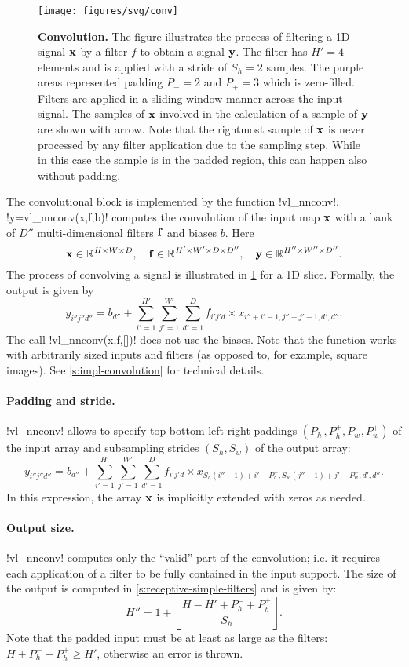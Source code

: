 \begin{figure}[t]
	\centering
	\texttt{[image: figures/svg/conv]}
	\caption{\textbf{Convolution.} The figure illustrates the process of filtering a 1D signal $\mathbf{x}$ by a filter $f$ to obtain a signal $\mathbf{y}$. The filter has $H'=4$ elements and is applied with a stride of $S_h =2$ samples. The purple areas represented padding $P_-=2$ and $P_+=3$ which is zero-filled. Filters are applied in a sliding-window manner across the input signal. The samples of $\mathbf{x}$ involved in the calculation of a sample of $\mathbf{y}$ are shown with arrow. Note that the rightmost sample of $\mathbf{x}$  is never processed by any filter application due to the sampling step. While in this case the sample is in the padded region, this can happen also without padding.}\label{f:conv}
\end{figure}

The convolutional block is implemented by the function !vl_nnconv!. !y=vl_nnconv(x,f,b)! computes the convolution of the input map $\mathbf{x}$ with a bank of $D''$ multi-dimensional filters $\mathbf{f}$ and biases $b$. Here
\[
 \mathbf{x}\in\mathbb{R}^{H \times W \times D}, \quad
 \mathbf{f}\in\mathbb{R}^{H' \times W' \times D \times D''}, \quad
 \mathbf{y}\in\mathbb{R}^{H'' \times W'' \times D''}.
\]
The process of convolving a signal is illustrated in \cref{f:conv} for a 1D slice. Formally, the output is given by
\[
y_{i''j''d''}
=
b_{d''}
+
\sum_{i'=1}^{H'}
\sum_{j'=1}^{W'}
\sum_{d'=1}^D
f_{i'j'd} \times x_{i''+i'-1,j''+j'-1,d',d''}.
\]
The call !vl_nnconv(x,f,[])! does not use the biases. Note that the function works with arbitrarily sized inputs and filters (as opposed to, for example, square images). See \cref{s:impl-convolution} for technical details.

\paragraph{Padding and stride.} !vl_nnconv! allows to specify  top-bottom-left-right paddings $(P_h^-,P_h^+,P_w^-,P_w^+)$ of the input array and subsampling strides $(S_h,S_w)$ of the output array:
\[
y_{i''j''d''}
=
b_{d''}
+
\sum_{i'=1}^{H'}
\sum_{j'=1}^{W'}
\sum_{d'=1}^D
f_{i'j'd} \times x_{S_h (i''-1)+i'-P_h^-, S_w(j''-1)+j' - P_w^-,d',d''}.
\]
In this expression, the array $\mathbf{x}$ is implicitly extended with zeros as needed.

\paragraph{Output size.} !vl_nnconv! computes only the ``valid'' part of the convolution; i.e. it requires each application of a filter to be fully contained in the input support.  The size of the output is computed in \cref{s:receptive-simple-filters} and is given by:
\[
  H'' = 1 + \left\lfloor \frac{H - H' + P_h^- + P_h^+}{S_h} \right\rfloor.
\]
Note that the padded input must be at least as large as the filters: $H +P_h^- + P_h^+ \geq H'$, otherwise an error is thrown.

